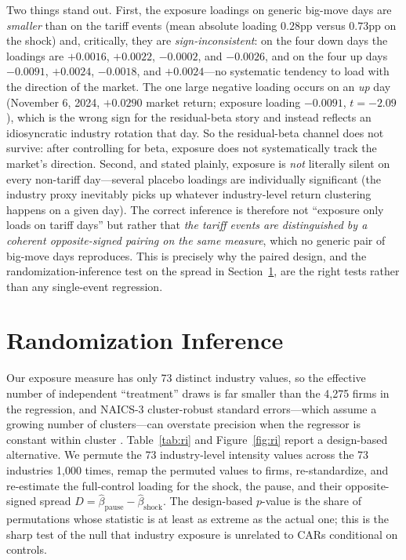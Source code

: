 \documentclass[12pt]{article}
\begin{document}
Two things stand out. First, the exposure loadings on generic big-move days are \emph{smaller}
than on the tariff events (mean absolute loading $0.28$pp versus $0.73$pp on the shock) and,
critically, they are \emph{sign-inconsistent}: on the four down days the loadings are
$+0.0016$, $+0.0022$, $-0.0002$, and $-0.0026$, and on the four up days $-0.0091$, $+0.0024$,
$-0.0018$, and $+0.0024$---no systematic tendency to load with the direction of the market.
The one large negative loading occurs on an \emph{up} day (November 6, 2024, $+0.0290$ market
return; exposure loading $-0.0091$, $t=-2.09$), which is the wrong sign for the residual-beta
story and instead reflects an idiosyncratic industry rotation that day. So the residual-beta
channel does not survive: after controlling for beta, exposure does not systematically track
the market's direction. Second, and stated plainly, exposure is \emph{not} literally silent on
every non-tariff day---several placebo loadings are individually significant (the industry
proxy inevitably picks up whatever industry-level return clustering happens on a given day).
The correct inference is therefore not ``exposure only loads on tariff days'' but rather that
\emph{the tariff events are distinguished by a coherent opposite-signed pairing on the same
measure}, which no generic pair of big-move days reproduces. This is precisely why the paired
design, and the randomization-inference test on the spread in Section~\ref{sec:ri}, are the
right tests rather than any single-event regression.

\section{Randomization Inference}\label{sec:ri}
Our exposure measure has only 73 distinct industry values, so the effective number of
independent ``treatment'' draws is far smaller than the 4{,}275 firms in the regression, and
NAICS-3 cluster-robust standard errors---which assume a growing number of clusters---can
overstate precision when the regressor is constant within cluster
\citep{cameron2008,young2019}. Table~\ref{tab:ri} and Figure~\ref{fig:ri} report a
design-based alternative. We permute the 73 industry-level intensity values across the 73
industries 1{,}000 times, remap the permuted values to firms, re-standardize, and re-estimate
the full-control loading for the shock, the pause, and their opposite-signed spread
$D=\hat\beta_{\text{pause}}-\hat\beta_{\text{shock}}$. The design-based $p$-value is the share
of permutations whose statistic is at least as extreme as the actual one; this is the sharp
test of the null that industry exposure is unrelated to CARs conditional on controls.
\end{document}
